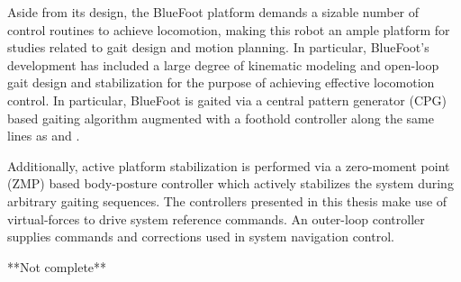 		Aside from its design, the BlueFoot platform demands a sizable number of control routines to achieve locomotion, making this robot an ample platform for studies related to gait design and motion planning. In particular, BlueFoot's development has included a large degree of kinematic modeling and open-loop gait design and stabilization for the purpose of achieving effective locomotion control. In particular, BlueFoot is  gaited via a central pattern generator (CPG) based gaiting algorithm augmented with a foothold controller along the same lines as \cite{Ajallooeian2013} and \cite{Rutishauser2008}. 

		Additionally, active platform stabilization is performed via a zero-moment point (ZMP) based body-posture controller which actively stabilizes the system during arbitrary gaiting sequences. The controllers presented in this thesis make use of virtual-forces to drive system reference commands. An outer-loop controller supplies commands and corrections used in system navigation control.

**Not complete**